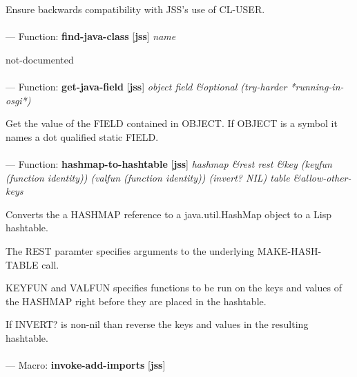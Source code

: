 \begin{adjustwidth}{5em}{5em}
Ensure backwards compatibility with JSS's use of CL-USER.
\end{adjustwidth}

\paragraph{}
\label{JSS:FIND-JAVA-CLASS}
--- Function: \textbf{find-java-class} [\textbf{jss}] \textit{name}

\begin{adjustwidth}{5em}{5em}
not-documented
\end{adjustwidth}

\paragraph{}
\label{JSS:GET-JAVA-FIELD}
--- Function: \textbf{get-java-field} [\textbf{jss}] \textit{object field \&optional (try-harder *running-in-osgi*)}

\begin{adjustwidth}{5em}{5em}
Get the value of the FIELD contained in OBJECT.
If OBJECT is a symbol it names a dot qualified static FIELD.
\end{adjustwidth}

\paragraph{}
\label{JSS:HASHMAP-TO-HASHTABLE}
--- Function: \textbf{hashmap-to-hashtable} [\textbf{jss}] \textit{hashmap \&rest rest \&key (keyfun (function identity)) (valfun (function identity)) (invert? NIL) table \&allow-other-keys}

\begin{adjustwidth}{5em}{5em}
Converts the a HASHMAP reference to a java.util.HashMap object to a Lisp hashtable.

The REST paramter specifies arguments to the underlying MAKE-HASH-TABLE call.

KEYFUN and VALFUN specifies functions to be run on the keys and values
of the HASHMAP right before they are placed in the hashtable.

If INVERT? is non-nil than reverse the keys and values in the resulting hashtable.
\end{adjustwidth}

\paragraph{}
\label{JSS:INVOKE-ADD-IMPORTS}
--- Macro: \textbf{invoke-add-imports} [\textbf{jss}] \textit{}

